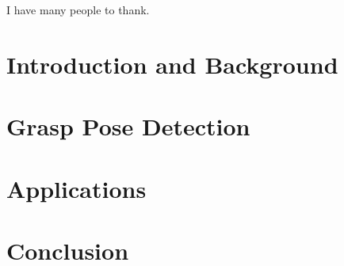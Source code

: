 \documentclass{ucbthesis}
\begin{document}
\begin{frontmatter}



\tableofcontents
\clearpage
\listoffigures
\clearpage
\listoftables

\begin{acknowledgements}
I have many people to thank.
\end{acknowledgements}

\end{frontmatter}

\pagestyle{headings}

\part{Introduction and Background}
\label{par:intro}
% 
% 

\part{Grasp Pose Detection}
\label{par:algorithms}
% 
% 
% 
% 

\part{Applications}
\label{par:applications}
% 
% 

\part{Conclusion}
\label{par:conclusion}


\printbibliography

\end{document}
